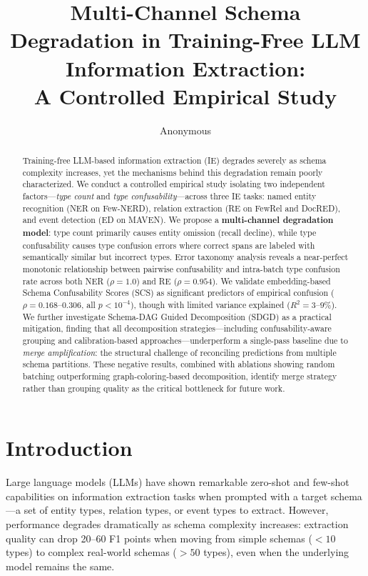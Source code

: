\documentclass[11pt,a4paper]{article}
\title{Multi-Channel Schema Degradation in Training-Free LLM Information Extraction:\\A Controlled Empirical Study}
\author{Anonymous}
\date{}
\begin{document}
\maketitle

\begin{abstract}
Training-free LLM-based information extraction (IE) degrades severely as schema complexity increases, yet the mechanisms behind this degradation remain poorly characterized.
We conduct a controlled empirical study isolating two independent factors---\emph{type count} and \emph{type confusability}---across three IE tasks: named entity recognition (NER on Few-NERD), relation extraction (RE on FewRel and DocRED), and event detection (ED on MAVEN).
We propose a \textbf{multi-channel degradation model}: type count primarily causes entity omission (recall decline), while type confusability causes type confusion errors where correct spans are labeled with semantically similar but incorrect types.
Error taxonomy analysis reveals a near-perfect monotonic relationship between pairwise confusability and intra-batch type confusion rate across both NER ($\rho{=}1.0$) and RE ($\rho{=}0.954$).
We validate embedding-based Schema Confusability Scores (SCS) as significant predictors of empirical confusion ($\rho{=}0.168$--$0.306$, all $p < 10^{-4}$), though with limited variance explained ($R^2{=}3$--$9\%$).
We further investigate Schema-DAG Guided Decomposition (SDGD) as a practical mitigation, finding that all decomposition strategies---including confusability-aware grouping and calibration-based approaches---underperform a single-pass baseline due to \emph{merge amplification}: the structural challenge of reconciling predictions from multiple schema partitions.
These negative results, combined with ablations showing random batching outperforming graph-coloring-based decomposition, identify merge strategy rather than grouping quality as the critical bottleneck for future work.
\end{abstract}

\section{Introduction}

Large language models (LLMs) have shown remarkable zero-shot and few-shot capabilities on information extraction tasks when prompted with a target schema---a set of entity types, relation types, or event types to extract.
However, performance degrades dramatically as schema complexity increases: extraction quality can drop 20--60 F1 points when moving from simple schemas ($<10$ types) to complex real-world schemas ($>50$ types), even when the underlying model remains the same.
\end{document}
